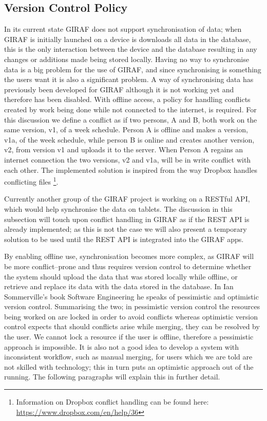 \subsection{Version Control Policy}
In its current state GIRAF does not support synchronisation of data; when GIRAF is initially launched on a device is downloads all data in the database, this is the only interaction between the device and the database resulting in any changes or additions made being stored locally.
Having no way to synchronise data is a big problem for the use of GIRAF, and since synchronising is something the users want it is also a significant problem.
A way of synchronising data has previously been developed for GIRAF although it is not working yet and therefore has been disabled.
With offline access, a policy for handling conflicts created by work being done while not connected to the internet, is required.
For this discussion we define a conflict as if two persons, A and B, both work on the same version, v1, of a week schedule.
Person A is offline and makes a version, v1a, of the week schedule, while person B is online and creates another version, v2, from version v1 and uploads it to the server.
When Person A regains an internet connection the two versions, v2 and v1a, will be in write conflict with each other. 
The implemented solution is inspired from the way Dropbox handles conflicting files \footnote{Information on Dropbox conflict handling can be found here: \url{https://www.dropbox.com/en/help/36}}. 

\bigskip \noindent
Currently another group of the GIRAF project is working on a RESTful API, which would help synchronise the data on tablets.
The discussion in this subsection will touch upon conflict handling in GIRAF as if the REST API is already implemented; as this is not the case we will also present a temporary solution to be used until the REST API is integrated into the GIRAF apps.

By enabling offline use, synchronisation becomes more complex, as GIRAF will be more conflict--prone and thus requires version control to determine whether the system should upload the data that was stored locally while offline, or retrieve and replace its data with the data stored in the database.
In Ian Sommerville's book Software Engineering \citep{SEBOOK} he speaks of pessimistic and optimistic version control.
Summarising the two; in pessimistic version control the resources being worked on are locked in order to avoid conflicts whereas optimistic version control expects that should conflicts arise while merging, they can be resolved by the user.
We cannot lock a resource if the user is offline, therefore a pessimistic approach is impossible.
It is also not a good idea to develop a system with inconsistent workflow, such as manual merging, for users which we are told are not skilled with technology; this in turn puts an optimistic approach out of the running.
The following paragraphs will explain this in further detail.

